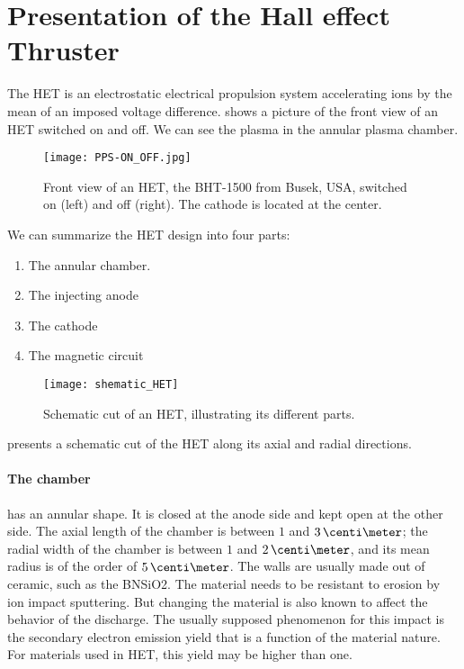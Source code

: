 

\section{Presentation of the Hall effect Thruster }
  \label{sec-HET}

  
  The \ac{HET} is an electrostatic electrical propulsion system accelerating ions by the mean of an imposed voltage difference.
   shows a picture of the front view of an \ac{HET} switched on and off.
  We can see the plasma in the annular plasma chamber.
  \begin{figure}[!hbt]
    \centering
    \texttt{[image: PPS-ON\_OFF.jpg]}
    \caption{Front view of an \acs{HET}, the BHT-1500 from Busek, USA, switched on (left) and off (right). The cathode is located at the center.}
    \label{fig-bhtonoff}
  \end{figure}

  We can summarize the \ac{HET} design into four parts\string:
  \begin{enumerate}
    \item The annular chamber.
    \item The injecting anode
    \item The cathode
    \item The magnetic circuit
  \end{enumerate}

  \begin{figure}[!hbt]
    \centering
    \texttt{[image: shematic\_HET]}
    \caption{Schematic cut of an \acs{HET}, illustrating its different parts. }
    \label{fig-shematiccut}
  \end{figure}

   presents a schematic cut of the \ac{HET} along its axial and radial directions.

  \paragraph{The chamber} has an annular shape.
  It is closed at the anode side and kept open at the other side.
  The axial length of the chamber is between $1$ and $3\,\centi\meter$; the radial width of the chamber is between $1$ and $2\,\centi\meter$, and its mean radius is of the order of $5\,\centi\meter$. 
  The walls are usually made out of ceramic, such as the \ac{BNSiO2}.
  The material needs to be resistant to erosion by ion impact sputtering.
  But changing the material is also known to affect the behavior of the discharge.
  The usually supposed phenomenon for this impact is the secondary electron emission yield that is a function of the material nature.
  For materials used in HET, this yield may be higher than one.


